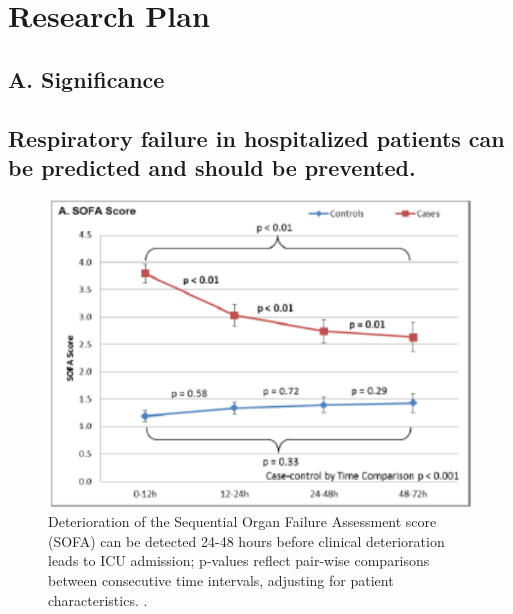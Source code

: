\documentclass[11pt,notitlepage]{article}
\begin{document}
 
\section*{Research Plan}

\subsection*{A. Significance}

\subsection*{Respiratory failure in hospitalized patients can be predicted and should be prevented.} 

\begin{figure}
 \vspace{-10pt}
 \includegraphics[scale=0.7]{Figures/SOFA_fig.png}
  \vspace{-25pt}
  \caption{\footnotesize Deterioration of the Sequential Organ Failure Assessment score (SOFA) can be detected 24-48 hours before clinical deterioration leads to ICU admission; p-values reflect pair-wise comparisons between consecutive time intervals, adjusting for patient characteristics. \cite{Yu_24970344}.}
    \label{fig:SOFA_fig}
 \vspace{-15pt}
\end{figure}
\end{document}
